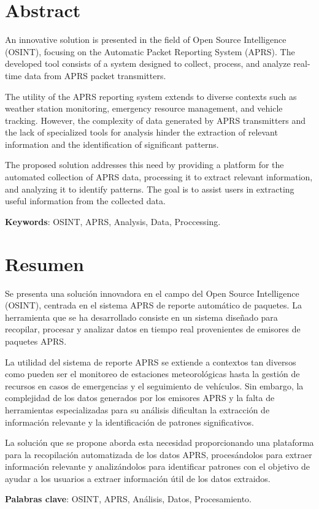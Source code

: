 \chapter*{Abstract}

	An innovative solution is presented in the field of Open Source Intelligence (OSINT), focusing on the Automatic Packet Reporting System (APRS). The developed tool consists of a system designed to collect, process, and analyze real-time data from APRS packet transmitters.

	The utility of the APRS reporting system extends to diverse contexts such as weather station monitoring, emergency resource management, and vehicle tracking. However, the complexity of data generated by APRS transmitters and the lack of specialized tools for analysis hinder the extraction of relevant information and the identification of significant patterns.

	The proposed solution addresses this need by providing a platform for the automated collection of APRS data, processing it to extract relevant information, and analyzing it to identify patterns. The goal is to assist users in extracting useful information from the collected data.
    
    \textbf{Keywords}: OSINT, APRS, Analysis, Data, Proccessing.



\chapter*{Resumen}

	Se presenta una solución innovadora en el campo del Open Source Intelligence (OSINT), centrada en el sistema APRS de reporte automático de paquetes. La herramienta que se ha desarrollado consiste en un sistema diseñado para recopilar, procesar y analizar datos en tiempo real provenientes de emisores de paquetes APRS.

	La utilidad del sistema de reporte APRS se extiende a contextos tan diversos como pueden ser el monitoreo de estaciones meteorológicas hasta la gestión de recursos en casos de emergencias y el seguimiento de vehículos. Sin embargo, la complejidad de los datos generados por los emisores APRS y la falta de herramientas especializadas para su análisis dificultan la extracción de información relevante y la identificación de patrones significativos.

	La solución que se propone aborda esta necesidad proporcionando una plataforma para la recopilación automatizada de los datos APRS, procesándolos para extraer información relevante y analizándolos para identificar patrones con el objetivo de ayudar a los usuarios a extraer información útil de los datos extraidos.
    
    \textbf{Palabras clave}: OSINT, APRS, Análisis, Datos, Procesamiento.